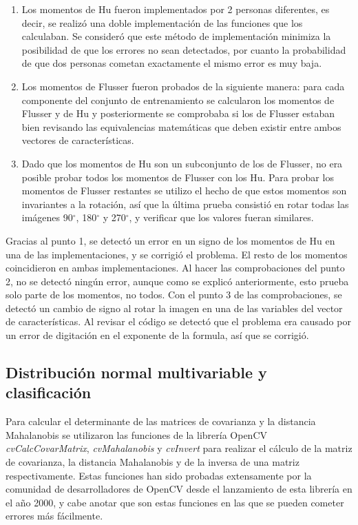 \documentclass[a4paper, 11pt, oneside]{report}
\begin{document}
	\begin{enumerate}

	\item Los momentos de Hu fueron implementados por 2 personas diferentes, es decir, se realizó una doble implementación de las funciones que los calculaban. Se consideró que este método de implementación minimiza la posibilidad de que los errores no sean detectados, por cuanto la probabilidad de que dos personas cometan exactamente el mismo error es muy baja.
	
	\item Los momentos de Flusser fueron probados de la siguiente manera: para cada componente del conjunto de entrenamiento se calcularon los momentos de Flusser y de Hu y posteriormente se comprobaba si los de Flusser estaban bien revisando las equivalencias matemáticas que deben existir entre ambos vectores de características. %
	
	\item Dado que los momentos de Hu son un subconjunto de los de Flusser, no era posible probar todos los momentos de Flusser con los Hu. Para probar los momentos de Flusser restantes se utilizo el hecho de que estos momentos son invariantes a la rotación, así que la última prueba consistió en rotar todas las imágenes 90$^\circ$, 180$^\circ$ y 270$^\circ$, y verificar que los valores fueran similares.
	
	\end{enumerate}

Gracias al punto 1, se detectó un error en un signo de los momentos de Hu en una de las implementaciones, y se corrigió el problema. El resto de los momentos coincidieron en ambas implementaciones. Al hacer las comprobaciones del punto 2, no se detectó ningún error, aunque como se explicó anteriormente, esto prueba solo parte de los momentos, no todos. Con el punto 3 de las comprobaciones, se detectó un cambio de signo al rotar la imagen en una de las variables del vector de características. Al revisar el código se detectó que el problema era causado por un error de digitación en el exponente de la formula, así que se corrigió.

\subsection{Distribución normal multivariable y clasificación}

Para calcular el determinante de las matrices de covarianza y la distancia Mahalanobis se utilizaron las funciones de la librería OpenCV {\it cvCalcCovarMatrix}, {\it cvMahalanobis} y {\it cvInvert} para realizar el cálculo de la matriz de covarianza, la distancia Mahalanobis y de la inversa de una matriz respectivamente. Estas funciones han sido probadas extensamente por la comunidad de desarrolladores de OpenCV desde el lanzamiento de esta librería en el año 2000, y cabe anotar que son estas funciones en las que se pueden cometer errores más fácilmente.
\end{document}
